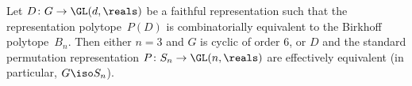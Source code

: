 \begin{introthm}\label{main:birkhoff_unique}
  Let $D\colon G\to \GL(d,\reals)$ be 
  a faithful representation such that
  the representation polytope~$P(D)$ is combinatorially equivalent
  to the Birkhoff polytope~$B_n$.
  Then either $n=3$ and $G$ is cyclic of order $6$,
  or $D$ and the standard permutation representation
  $P\colon S_n \to \GL(n,\reals)$ 
  are effectively equivalent  
  (in particular, $G\iso S_n$).
\end{introthm}
